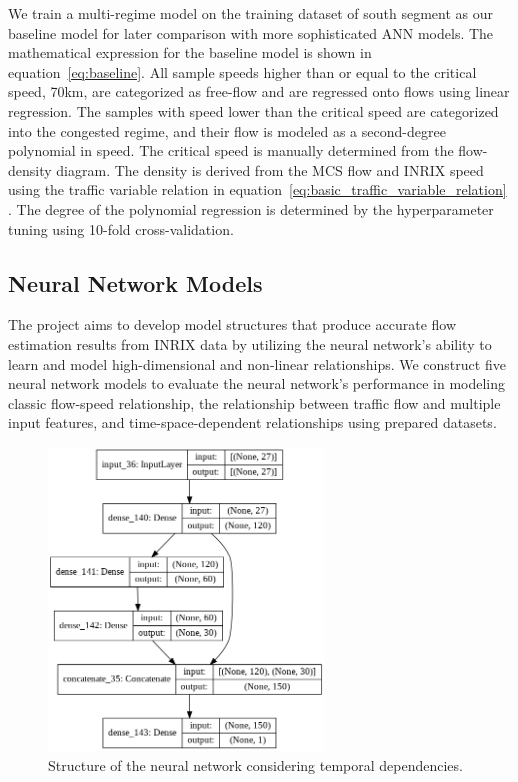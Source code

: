 \documentclass[english]{kththesis}
\begin{document}
We train a multi-regime model on the training dataset of south segment as our baseline model for later comparison with more sophisticated ANN models. The mathematical expression for the baseline model is shown in equation~\ref{eq:baseline}. All sample speeds higher than or equal to the critical speed, 70km, are categorized as free-flow and are regressed onto flows using linear regression. The samples with speed lower than the critical speed are categorized into the congested regime, and their flow is modeled as a second-degree polynomial in speed. The critical speed is manually determined from the flow-density diagram. The density is derived from the MCS flow and INRIX speed using the traffic variable relation in equation~\ref{eq:basic_traffic_variable_relation} \cite{blandin_individual_speed, nielsen_flow-speed_relations}. The degree of the polynomial regression is determined by the hyperparameter tuning using 10-fold cross-validation.

\subsection{Neural Network Models}
The project aims to develop model structures that produce accurate flow estimation results from INRIX data by utilizing the neural network's ability to learn and model high-dimensional and non-linear relationships. We construct five neural network models to evaluate the neural network's performance in modeling classic flow-speed relationship, the relationship between traffic flow and multiple input features, and time-space-dependent relationships using prepared datasets.

\begin{figure}[!ht]
    \centering
    \includegraphics[width=0.65\textwidth]{temporal_ann_structure.png}
    \caption{Structure of the neural network considering temporal dependencies.}
    \label{fig:temporal_ann_structure}
\end{figure}
\end{document}
